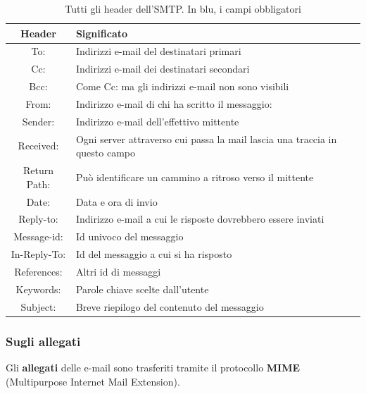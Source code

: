 \begin{table}[htp]
    \centering
    \begin{tabular}{|c|p{9cm}|}
        \hline
        \textbf{Header} & \textbf{Significato}\\
        \hline
        \cellcolor{blue!25}To: & Indirizzi e-mail del destinatari primari\\
        \hline
        Cc: & Indirizzi e-mail dei destinatari secondari\\
        \hline
        Bcc: & Come Cc: ma gli indirizzi e-mail non sono visibili\\
        \hline
        \cellcolor{blue!25}From: & Indirizzo e-mail di chi ha scritto il messaggio:\\
        \hline
        Sender: & Indirizzo e-mail dell'effettivo mittente\\
        \hline
        Received: & Ogni server attraverso cui passa la mail lascia
        una traccia in questo campo\\
        \hline
        Return Path: & Può identificare un cammino a ritroso verso il mittente\\
        \hline
        Date: & Data e ora di invio\\
        \hline
        Reply-to: & Indirizzo e-mail a cui le risposte dovrebbero essere inviati\\
        \hline
        Message-id: & Id univoco del messaggio\\
        \hline
        In-Reply-To:& Id del messaggio a cui si ha risposto\\
        \hline
        References: & Altri id di messaggi\\
        \hline
        Keywords: & Parole chiave scelte dall'utente\\
        \hline
        \cellcolor{blue!25} Subject: & Breve riepilogo del contenuto del messaggio\\
        \hline
    \end{tabular}
    \caption{Tutti gli header dell'SMTP. In blu, i campi obbligatori}
\end{table}

\subsubsection{Sugli allegati}
Gli \textbf{allegati} delle e-mail sono trasferiti tramite il protocollo \textbf{MIME} (Multipurpose Internet Mail Extension).

\newpage

